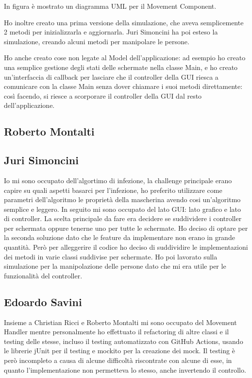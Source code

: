 In figura è mostrato un diagramma UML per il Movement Component.

Ho inoltre creato una prima versione della simulazione, che aveva semplicemente 2 metodi per inizializzarla e aggiornarla. Juri Simoncini ha poi esteso la simulazione, creando alcuni metodi per manipolare le persone.

Ho anche creato cose non legate al Model dell'applicazione: ad esempio ho creato una semplice gestione degli stati delle schermate nella classe Main, e ho creato un'interfaccia di callback per lasciare che il controller della GUI riesca a comunicare con la classe Main senza dover chiamare i suoi metodi direttamente: così facendo, si riesce a scorporare il controller della GUI dal resto dell'applicazione.

\subsection{Roberto Montalti}

\subsection{Juri Simoncini}
Io mi sono occupato dell'algortimo di infezione, la challenge principale erano capire su quali aspetti basarci per l'infezione, 
ho preferito utilizzare come parametri dell'algoritmo le proprietà della mascherina avendo cosi un'algoritmo semplice e leggero.
In seguito mi sono occupato del lato GUI: lato grafico e lato di controller.
La scelta principale da fare era decidere se suddividere i controller per schermata oppure tenerne uno per tutte le schermate.
Ho deciso di optare per la seconda soluzione dato che le feature da implementare non erano in grande quantità.
Però per alleggerire il codice ho deciso di suddividire le implementazioni dei metodi in varie classi suddivise per schermate.
Ho poi lavorato sulla simulazione per la manipolazione delle persone dato che mi era utile per le funzionalità del controller.



\subsection{Edoardo Savini}
Insieme a Christian Ricci e Roberto Montalti mi sono occupato del Movement Handler mentre personalmente ho effettuato il refactoring di altre classi e il testing delle stesse, incluso il testing automatizzato con GitHub Actions, usando le librerie jUnit per il testing e mockito per la creazione dei mock. Il testing è però incompleto a causa di alcune difficoltà riscontrate con alcune di esse, in quanto l'implementazione non permetteva lo stesso, anche invertendo il controllo.

